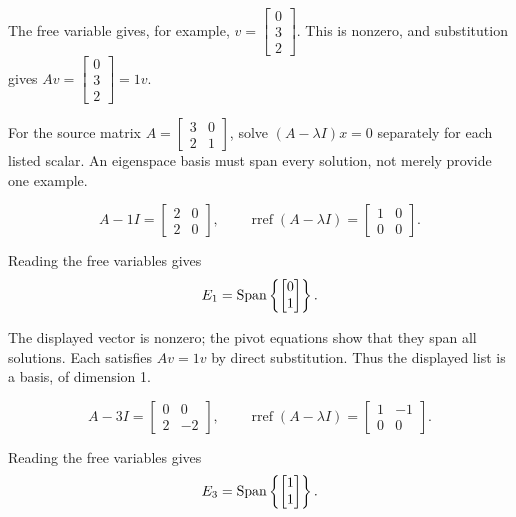 The free variable gives, for example, $v=\begin{bmatrix}0\\3\\2\end{bmatrix}$. This is nonzero, and substitution gives $Av=\begin{bmatrix}0\\3\\2\end{bmatrix}=1v$.

For the source matrix $A=\begin{bmatrix}3 & 0\\2 & 1\end{bmatrix}$, solve $(A-\lambda I)x=0$ separately for each listed scalar. An eigenspace basis must span every solution, not merely provide one example.

\[ A-1I=\begin{bmatrix}2 & 0\\2 & 0\end{bmatrix},\qquad\operatorname{rref}(A-\lambda I)=\begin{bmatrix}1 & 0\\0 & 0\end{bmatrix}.\]

Reading the free variables gives
\[ E_{1}=\operatorname{Span}\left\{\begin{bmatrix}0\\1\end{bmatrix}\right\}.\]

The displayed vector is nonzero; the pivot equations show that they span all solutions. Each satisfies $Av=1v$ by direct substitution. Thus the displayed list is a basis, of dimension 1.

\[ A-3I=\begin{bmatrix}0 & 0\\2 & -2\end{bmatrix},\qquad\operatorname{rref}(A-\lambda I)=\begin{bmatrix}1 & -1\\0 & 0\end{bmatrix}.\]

Reading the free variables gives
\[ E_{3}=\operatorname{Span}\left\{\begin{bmatrix}1\\1\end{bmatrix}\right\}.\]

